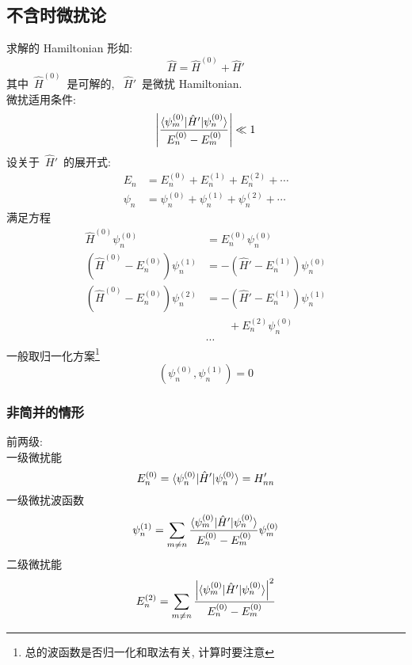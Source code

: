 \documentclass[11pt,a4paper,twocolumn,fleqn]{article}%
\renewcommand{\[}{~$}
\renewcommand{\]}{$~}%
\begin{document}
	\subsection{不含时微扰论}
	求解的 Hamiltonian 形如: 
	\begin{equation}
	 \hat H = \hat H^{(0)} + \hat H'
	\end{equation}
	其中\[\hat H^{(0)}\]是可解的, \[\hat H'\]是微扰 Hamiltonian.\\
	微扰适用条件:
	\begin{equation}
	 \left|\frac{\braket{\psi_m^{(0)}|\hat H'|\psi_n^{(0)}}}{E_n^{(0)}- E_m^{(0)}}\right|\ll 1
	\end{equation}
	设关于\[\hat H'\]的展开式:
	\begin{align}
	 E_n &= E_n^{(0)} + E_n^{(1)} + E_n^{(2)} + \cdots \\
	 \psi_n &= \psi_n^{(0)} + \psi_n^{(1)} + \psi_n^{(2)} + \cdots
	\end{align}
	满足方程
	\begin{align}
	 \hat H^{(0)}\psi_n^{(0)} &= E_n^{(0)}\psi_n^{(0)} \\
	 (\hat H^{(0)} - E_n^{(0)})\psi_n^{(1)} &= -(\hat H' - E_n^{(1)})\psi_n^{(0)} \\
	 (\hat H^{(0)} - E_n^{(0)})\psi_n^{(2)} &= -(\hat H' - E_n^{(1)})\psi_n^{(1)} \nonumber \\
	 &\qquad + E_n^{(2)}\psi_n^{(0)} \\
	 &\cdots \nonumber
	\end{align}
	一般取归一化方案\footnote{总的波函数是否归一化和取法有关, 计算时要注意}
	\begin{equation}
	 (\psi_n^{(0)},\psi_n^{(1)}) = 0
	\end{equation}
	\subsubsection{非简并的情形}
	前两级:\\
	一级微扰能
	\begin{equation}
	 E_n^{(0)} = \braket{\psi_n^{(0)}|\hat H'|\psi_n^{(0)}} = H'_{nn}
	\end{equation}
	一级微扰波函数
	\begin{equation}
	 \psi_n^{(1)} = \sum_{m\neq n}\frac{\braket{\psi_m^{(0)}|\hat H'|\psi_n^{(0)}}}{E_n^{(0)} - E_m^{(0)}}\psi_m^{(0)}
	\end{equation}
	二级微扰能
	\begin{equation}
	 E_n^{(2)} = \sum_{m\neq n}\frac{\left|\braket{\psi_m^{(0)}|\hat H'|\psi_n^{(0)}}\right|^2}{E_n^{(0)} - E_m^{(0)}}
	\end{equation}
\end{document}

